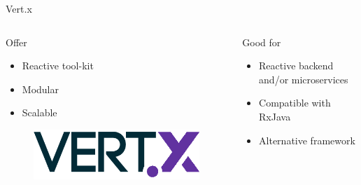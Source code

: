 \documentclass[14pt]{beamer}
\begin{document}

\begin{frame}[fragile]{Vert.x}
    \begin{columns}
        \begin{column}{0.5\textwidth}
            Offer
            \begin{itemize}
                \item Reactive tool-kit
                \item Modular
                \item Scalable
            \end{itemize}
         \begin{figure}
            \centering
            \includegraphics[width=0.3\linewidth]{Images/vertx}
        \end{figure}
        \end{column}
        \begin{column}{0.5\textwidth}  %
            Good for
            \begin{itemize}
                \item Reactive backend and/or microservices
                \item Compatible with RxJava
                \item Alternative framework
            \end{itemize}
        \end{column}
    \end{columns}
\end{frame}
\end{document}
